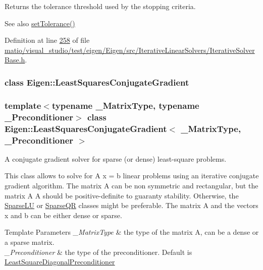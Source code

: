 \begin{DoxyReturn}{Returns}
the tolerance threshold used by the stopping criteria. 
\end{DoxyReturn}
\begin{DoxySeeAlso}{See also}
\hyperlink{group___iterative_linear_solvers___module_ac160a444af8998f93da9aa30e858470d}{set\+Tolerance()} 
\end{DoxySeeAlso}


Definition at line \hyperlink{matio_2visual__studio_2test_2eigen_2_eigen_2src_2_iterative_linear_solvers_2_iterative_solver_base_8h_source_l00258}{258} of file \hyperlink{matio_2visual__studio_2test_2eigen_2_eigen_2src_2_iterative_linear_solvers_2_iterative_solver_base_8h_source}{matio/visual\+\_\+studio/test/eigen/\+Eigen/src/\+Iterative\+Linear\+Solvers/\+Iterative\+Solver\+Base.\+h}.

\label{class_eigen_1_1_least_squares_conjugate_gradient}
\subsubsection{class Eigen\+:\+:Least\+Squares\+Conjugate\+Gradient}
\subsubsection*{template$<$typename \+\_\+\+Matrix\+Type, typename \+\_\+\+Preconditioner$>$\newline
class Eigen\+::\+Least\+Squares\+Conjugate\+Gradient$<$ \+\_\+\+Matrix\+Type, \+\_\+\+Preconditioner $>$}

A conjugate gradient solver for sparse (or dense) least-\/square problems. 

This class allows to solve for A x = b linear problems using an iterative conjugate gradient algorithm. The matrix A can be non symmetric and rectangular, but the matrix A\textquotesingle{} A should be positive-\/definite to guaranty stability. Otherwise, the \hyperlink{group___sparse_l_u___module_class_eigen_1_1_sparse_l_u}{Sparse\+LU} or \hyperlink{group___sparse_q_r___module_class_eigen_1_1_sparse_q_r}{Sparse\+QR} classes might be preferable. The matrix A and the vectors x and b can be either dense or sparse.


\begin{DoxyTemplParams}{Template Parameters}
{\em \+\_\+\+Matrix\+Type} & the type of the matrix A, can be a dense or a sparse matrix. \\
\hline
{\em \+\_\+\+Preconditioner} & the type of the preconditioner. Default is \hyperlink{group___iterative_linear_solvers___module_class_eigen_1_1_least_square_diagonal_preconditioner}{Least\+Square\+Diagonal\+Preconditioner}\\
\hline
\end{DoxyTemplParams}


